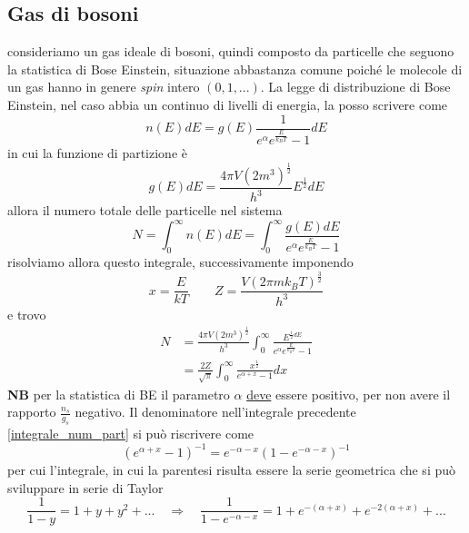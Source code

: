 \subsection{Gas di bosoni} consideriamo un gas ideale di bosoni, quindi composto da particelle che seguono la statistica di Bose Einstein, situazione abbastanza comune poiché le molecole di un gas hanno in genere \textit{spin} intero $(0, 1, ...)$.
La legge di distribuzione di Bose Einstein, nel caso abbia un continuo di livelli di energia, la posso scrivere come
\begin{equation}
n(E)dE = g(E) \frac{1}{e^{ \alpha } e^{ \frac{E}{k_B T} } - 1 } dE
\end{equation}
in cui la funzione di partizione è
\begin{equation}
g(E)dE = \frac{4\pi V (2m^3)^{ \frac{1}{2} }}{h^3} E^{\frac{1}{2} } dE
\end{equation}
allora il numero totale delle particelle nel sistema
\begin{equation}
N = \int_0^{\infty} n(E)dE =  \int_0^{\infty} \frac{g(E) dE}{e^{\alpha} e^{ \frac{E}{k_B T} } - 1} 
\end{equation}
risolviamo allora questo integrale, successivamente imponendo
\begin{equation}
x = \frac{E}{kT} \quad\quad Z = \frac{V (2 \pi m k_B T)^{ \frac{3}{2} } }{h^3}
\end{equation}
e trovo
\begin{equation}
\begin{split}
N & = \frac{4\pi V (2m^3)^{ \frac{1}{2} }}{h^3} \int_0^{\infty} \frac{E^{ \frac{1}{2} dE }}{e^{\alpha} e^{ \frac{E}{k_B T} } - 1}  \\
&= \frac{2Z}{\sqrt{\pi}} \int_0^{\infty} \frac{x^{ \frac{1}{2} }}{e^{ \alpha + x } - 1} dx
\label{integrale_num_part}
\end{split}
\end{equation}
\textbf{NB} per la statistica di BE il parametro $\alpha$ \underline{deve} essere positivo, per non avere il rapporto $\frac{n_s}{g_s}$ negativo.
Il denominatore nell'integrale precedente \ref{integrale_num_part} si può riscrivere come
\begin{equation}
(e^{ \alpha + x } - 1)^{-1} = e^{ - \alpha - x } (1 - e^{ - \alpha - x })^{ -1 }
\end{equation}
per cui l'integrale, in cui la parentesi risulta essere la serie geometrica che si può sviluppare in serie di Taylor
$$ \frac{1}{1-y} = 1 + y + y^2 + ... \quad\Rightarrow\quad \frac{1}{1 - e^{ -\alpha - x }} = 1 + e^{ - ( \alpha + x) } + e^{ - 2 ( \alpha + x) } + ... $$

